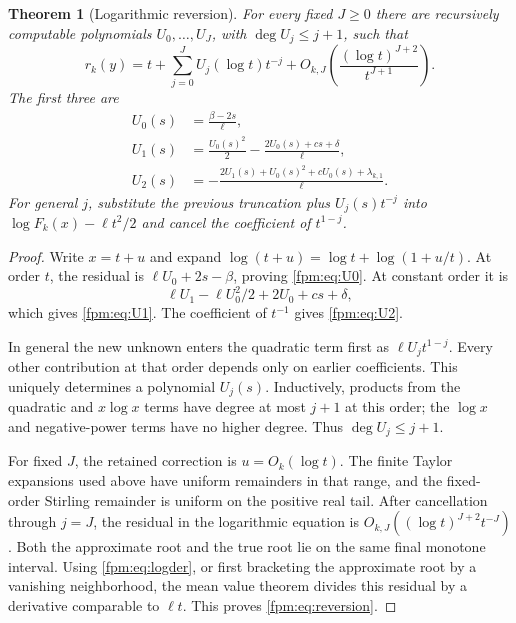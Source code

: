\documentclass[11pt]{article}
\newtheorem{theorem}{Theorem}[section]
\theoremstyle{definition}\newtheorem{definition}[theorem]{Definition}
\theoremstyle{remark}\newtheorem{remark}[theorem]{Remark}
\begin{document}
\begin{theorem}[Logarithmic reversion]\label{fpm:thm:reversion}
For every fixed $J\ge0$ there are recursively computable polynomials $U_0,\ldots,U_J$, with $\deg U_j\le j+1$, such that
\begin{equation}\label{fpm:eq:reversion}
 r_k(y)=t+\sum_{j=0}^J U_j(\log t)t^{-j}
 +O_{k,J}\!\left(\frac{(\log t)^{J+2}}{t^{J+1}}\right).
\end{equation}
The first three are
\begin{align}
 U_0(s)&=\frac{\beta-2s}{\ell},\label{fpm:eq:U0}\\
 U_1(s)&=\frac{U_0(s)^2}{2}
 -\frac{2U_0(s)+cs+\delta}{\ell},\label{fpm:eq:U1}\\
 U_2(s)&=-\frac{2U_1(s)+U_0(s)^2+cU_0(s)+\lambda_{k,1}}{\ell}.
 \label{fpm:eq:U2}
\end{align}
For general $j$, substitute the previous truncation plus $U_j(s)t^{-j}$ into $\log F_k(x)-\ell t^2/2$ and cancel the coefficient of $t^{1-j}$.
\end{theorem}
\begin{proof}
Write $x=t+u$ and expand
$\log(t+u)=\log t+\log(1+u/t)$. At order $t$, the residual is
$\ell U_0+2s-\beta$, proving \eqref{fpm:eq:U0}. At constant order it is
\[
 \ell U_1-\ell U_0^2/2+2U_0+cs+\delta,
\]
which gives \eqref{fpm:eq:U1}. The coefficient of $t^{-1}$ gives \eqref{fpm:eq:U2}.

In general the new unknown enters the quadratic term first as $\ell U_jt^{1-j}$. Every other contribution at that order depends only on earlier coefficients. This uniquely determines a polynomial $U_j(s)$. Inductively, products from the quadratic and $x\log x$ terms have degree at most $j+1$ at this order; the $\log x$ and negative-power terms have no higher degree. Thus $\deg U_j\le j+1$.

For fixed $J$, the retained correction is $u=O_k(\log t)$. The finite Taylor expansions used above have uniform remainders in that range, and the fixed-order Stirling remainder is uniform on the positive real tail. After cancellation through $j=J$, the residual in the logarithmic equation is
$O_{k,J}((\log t)^{J+2}t^{-J})$. Both the approximate root and the true root lie on the same final monotone interval. Using \eqref{fpm:eq:logder}, or first bracketing the approximate root by a vanishing neighborhood, the mean value theorem divides this residual by a derivative comparable to $\ell t$. This proves \eqref{fpm:eq:reversion}.
\end{proof}
\end{document}
